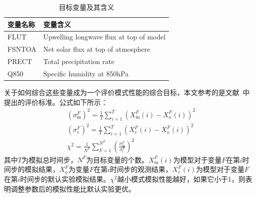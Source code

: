 
\begin{table}[H]
\centering
\caption{目标变量及其含义}  
\begin{tabular}{ll}
\toprule[1.5pt]
变量名称 & 变量含义 \\  
\hline  
FLUT     & Upwelling longwave flux at top of model   \\
    FSNTOA   & Net solar flux at top of atmosphere   \\
    PRECT    & Total precipitation rate   \\
    Q850     & Specific humidity at 850hPa   \\
\bottomrule[1.5pt]  
\end{tabular}  
\end{table}  

     关于如何综合这些变量成为一个评价模式性能的综合目标，本文参考的是文献~\cite{zhang2015automatic}中提出的评价标准。公式如下所示：
\begin{align}
& \left( \sigma _ { \mathrm { m } } ^ { F } \right) ^ { 2 } = \frac{1}{T}\sum _ { i = 1 } ^ { T }  \left( X _ { \mathrm { m } } ^ { F } ( i ) - X _ { \mathrm { o } } ^ { F } ( i ) \right) ^ { 2 }  \label{eq:rel1} \\
& \left( \sigma _ { r } ^ { F } \right) ^ { 2 } = \frac{1}{T}\sum _ { i = 1 } ^ { T }  \left( X _ { r } ^ { F } ( i ) - X _ { \mathrm { o } } ^ { F } ( i ) \right) ^ { 2 }  \label{eq:rel1} \\
& \chi ^ { 2 } = \frac { 1 } { N ^ { F } } \sum _ { F = 1 } ^ { N ^ { F } } \left( \frac { \sigma _ { \mathrm { m } } ^ { F } } { \sigma _ { r } ^ { F } } \right) ^ { 2 }  \label{eq:singleindict}
\end{align}
其中$T$为模拟总时间步，$N ^ { F }$为目标变量的个数。$X _ { \mathrm { m } } ^ { F } ( i )$为模型对于变量$F$在第$i$时间步的模拟结果，$X _ { \mathrm { o } } ^ { F } $为变量$F$在第$i$时间步的观测结果，$X _ { r } ^ { F } ( i ) $为模型对于变量$F$在第$i$时间步的默认实验模拟结果。$\chi ^ { 2 }$越小模式模拟性能越好，如果它小于1，则表明调整参数后的模拟性能比默认实验更优。

